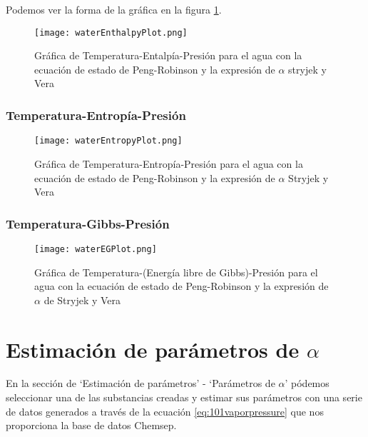 		Podemos ver la forma de la gráfica en la figura \ref{fig:hplot}.

		\begin{figure}[H]
			\texttt{[image: waterEnthalpyPlot.png]}
			\caption{Gráfica de Temperatura-Entalpía-Presión para el agua con la ecuación de estado de Peng-Robinson y la expresión de $\alpha$ stryjek y Vera}
			\label{fig:hplot}
		\end{figure}
	\subsubsection{Temperatura-Entropía-Presión}\label{subsec:tsp}	
		\begin{figure}[H]
			\texttt{[image: waterEntropyPlot.png]}
			\caption{Gráfica de Temperatura-Entropía-Presión para el agua con la ecuación de estado de Peng-Robinson y la expresión de $\alpha$ Stryjek y Vera}
			\label{fig:splot}
		\end{figure}
	\subsubsection{Temperatura-Gibbs-Presión}\label{subsec:tgp}
		\begin{figure}[H]
			\texttt{[image: waterEGPlot.png]}
			\caption{Gráfica de Temperatura-(Energía libre de Gibbs)-Presión para el agua con la ecuación de estado de Peng-Robinson y la expresión de $\alpha$ de Stryjek y Vera}
			\label{gplot}
		\end{figure}
	
	
\section{Estimación de parámetros de $\alpha$}\label{sec:webAlphaOptim}
	En la sección de `Estimación de parámetros' - `Parámetros de $\alpha$' pódemos seleccionar una de las substancias creadas y estimar sus parámetros con una serie de datos generados a través de la ecuación \ref{eq:101vaporpressure} que nos proporciona la base de datos Chemsep.

